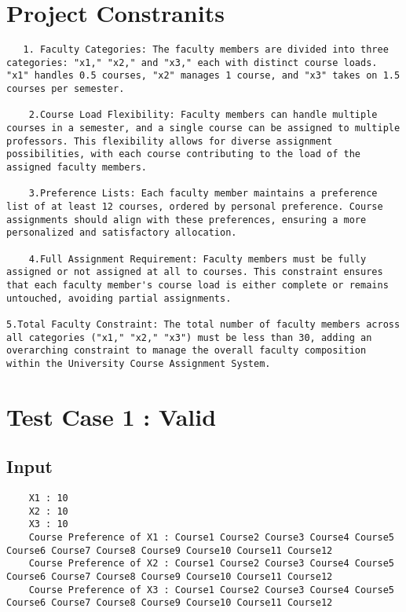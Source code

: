 \documentclass{article}
\begin{document}
\section*{Project Constranits}
\begin{verbatim}
   1. Faculty Categories: The faculty members are divided into three categories: "x1," "x2," and "x3," each with distinct course loads. "x1" handles 0.5 courses, "x2" manages 1 course, and "x3" takes on 1.5 courses per semester.

    2.Course Load Flexibility: Faculty members can handle multiple courses in a semester, and a single course can be assigned to multiple professors. This flexibility allows for diverse assignment possibilities, with each course contributing to the load of the assigned faculty members.
    
    3.Preference Lists: Each faculty member maintains a preference list of at least 12 courses, ordered by personal preference. Course assignments should align with these preferences, ensuring a more personalized and satisfactory allocation.
    
    4.Full Assignment Requirement: Faculty members must be fully assigned or not assigned at all to courses. This constraint ensures that each faculty member's course load is either complete or remains untouched, avoiding partial assignments.
    
5.Total Faculty Constraint: The total number of faculty members across all categories ("x1," "x2," "x3") must be less than 30, adding an overarching constraint to manage the overall faculty composition within the University Course Assignment System.    
\end{verbatim}

\section*{Test Case 1 : Valid}

\subsection*{Input}
\begin{verbatim}
    X1 : 10
    X2 : 10
    X3 : 10
    Course Preference of X1 : Course1 Course2 Course3 Course4 Course5 Course6 Course7 Course8 Course9 Course10 Course11 Course12
    Course Preference of X2 : Course1 Course2 Course3 Course4 Course5 Course6 Course7 Course8 Course9 Course10 Course11 Course12
    Course Preference of X3 : Course1 Course2 Course3 Course4 Course5 Course6 Course7 Course8 Course9 Course10 Course11 Course12
\end{verbatim}
\end{document}
